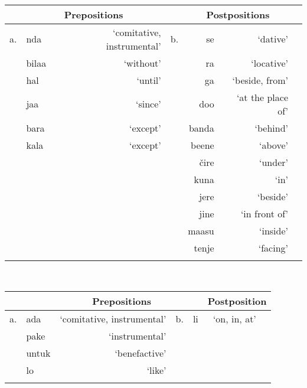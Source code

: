\documentclass[output=paper]{langsci/langscibook}
\begin{document}
\begin{table}
\\
\begin{tabularx}{\textwidth}{Xlrrrrr}
\lsptoprule
  & \multicolumn{2}{c}{\bfseries Prepositions} &  & \multicolumn{2}{c}{\bfseries Postpositions}\\
\midrule
a. & nda & ‘comitative, instrumental’ & b. & se & ‘dative’\\
 & bilaa & ‘without’ &  & ra & ‘locative’\\
 & hal & ‘until’ &  & ga & ‘beside, from’\\
 & jaa & ‘since’ &  & doo & ‘at the place of’\\
 & bara & ‘except’ &  & banda & ‘behind’\\
 & kala & ‘except’ &  & beene & ‘above’\\
 &  &  &  & čire & ‘under’\\
 &  &  &  & kuna & ‘in’\\
 &  &  &  & jere & ‘beside’\\
 &  &  &  & jine & ‘in front of’\\
 &  &  &  & maasu & ‘inside’\\
 &  &  &  & tenje & ‘facing’\\
\lspbottomrule
\end{tabularx}
\end{table}

\begin{table}
\\
\begin{tabularx}{\textwidth}{Xlrrrrr}
\lsptoprule
&  & \multicolumn{2}{c}{\bfseries Prepositions} &  & \multicolumn{2}{c}{\bfseries Postposition}\\
\midrule
a. & ada & ‘comitative, instrumental’ & b. & li & ‘on, in, at’\footnotemark{}\\
 & pake & ‘instrumental’ &  &  & \\
 & untuk & ‘benefactive’ &  &  & \\
 & lo & ‘like’ &  &  & \\
\lspbottomrule
\end{tabularx}
\end{table}
\end{document}
